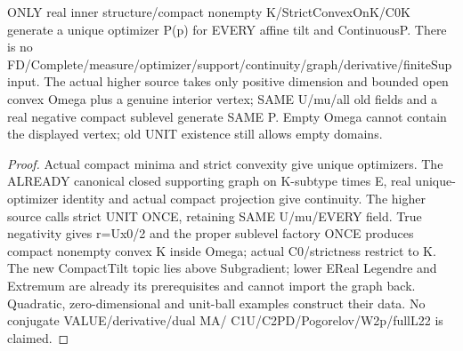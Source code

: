 \begin{lemma}
  \label{lem:compact-tilt-optimizer}
  \leanok
  ONLY real inner structure/compact nonempty K/StrictConvexOnK/C0K generate
  a unique optimizer P(p) for EVERY affine tilt and ContinuousP. There is no
  FD/Complete/measure/optimizer/support/continuity/graph/derivative/finiteSup
  input. The actual higher source takes only positive dimension and bounded
  open convex Omega plus a genuine interior vertex; SAME U/mu/all old fields
  and a real negative compact sublevel generate SAME P. Empty Omega cannot
  contain the displayed vertex; old UNIT existence still allows empty domains.
\end{lemma}
\begin{proof}
  \leanok
  Actual compact minima and strict convexity give unique optimizers. The
  ALREADY canonical closed supporting graph on K-subtype times E, real
  unique-optimizer identity and actual compact projection give continuity.
  The higher source calls strict UNIT ONCE, retaining SAME U/mu/EVERY field.
  True negativity gives r=Ux0/2 and the proper sublevel factory ONCE produces
  compact nonempty convex K inside Omega; actual C0/strictness restrict to K.
  The new CompactTilt topic lies above Subgradient; lower EReal Legendre and
  Extremum are already its prerequisites and cannot import the graph back.
  Quadratic, zero-dimensional and unit-ball
  examples construct their data. No conjugate VALUE/derivative/dual MA/
  C1U/C2PD/Pogorelov/W2p/fullL22 is claimed.
\end{proof}


